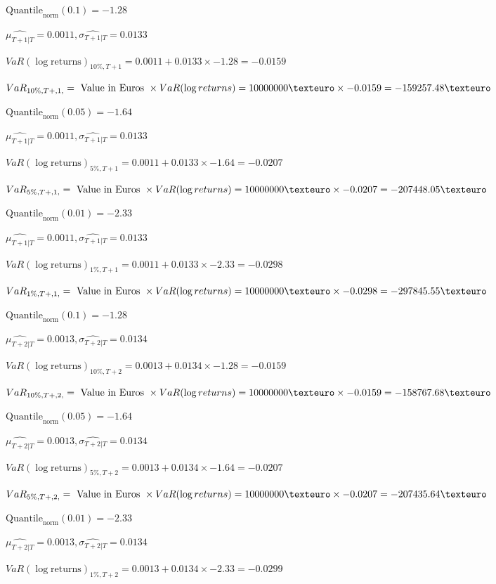$\text{Quantile}_\text{norm}(0.1) = -1.28$

$\hat{\mu_{T+1|T}} = 0.0011, \hat{\sigma_{T+1|T}} = 0.0133$

$VaR(\log \text{returns})_{10\%, T + 1} = 0.0011 + 0.0133\times-1.28 = -0.0159$

$VaR_{10\%, T + ,1,} = \text{ Value in Euros } \times VaR(\log returns) = 10 000 000 \texteuro \times-0.0159 = -159257.48 \texteuro$


$\text{Quantile}_\text{norm}(0.05) = -1.64$

$\hat{\mu_{T+1|T}} = 0.0011, \hat{\sigma_{T+1|T}} = 0.0133$

$VaR(\log \text{returns})_{5\%, T + 1} = 0.0011 + 0.0133\times-1.64 = -0.0207$

$VaR_{5\%, T + ,1,} = \text{ Value in Euros } \times VaR(\log returns) = 10 000 000 \texteuro \times-0.0207 = -207448.05 \texteuro$


$\text{Quantile}_\text{norm}(0.01) = -2.33$

$\hat{\mu_{T+1|T}} = 0.0011, \hat{\sigma_{T+1|T}} = 0.0133$

$VaR(\log \text{returns})_{1\%, T + 1} = 0.0011 + 0.0133\times-2.33 = -0.0298$

$VaR_{1\%, T + ,1,} = \text{ Value in Euros } \times VaR(\log returns) = 10 000 000 \texteuro \times-0.0298 = -297845.55 \texteuro$


$\text{Quantile}_\text{norm}(0.1) = -1.28$

$\hat{\mu_{T+2|T}} = 0.0013, \hat{\sigma_{T+2|T}} = 0.0134$

$VaR(\log \text{returns})_{10\%, T + 2} = 0.0013 + 0.0134\times-1.28 = -0.0159$

$VaR_{10\%, T + ,2,} = \text{ Value in Euros } \times VaR(\log returns) = 10 000 000 \texteuro \times-0.0159 = -158767.68 \texteuro$


$\text{Quantile}_\text{norm}(0.05) = -1.64$

$\hat{\mu_{T+2|T}} = 0.0013, \hat{\sigma_{T+2|T}} = 0.0134$

$VaR(\log \text{returns})_{5\%, T + 2} = 0.0013 + 0.0134\times-1.64 = -0.0207$

$VaR_{5\%, T + ,2,} = \text{ Value in Euros } \times VaR(\log returns) = 10 000 000 \texteuro \times-0.0207 = -207435.64 \texteuro$


$\text{Quantile}_\text{norm}(0.01) = -2.33$

$\hat{\mu_{T+2|T}} = 0.0013, \hat{\sigma_{T+2|T}} = 0.0134$

$VaR(\log \text{returns})_{1\%, T + 2} = 0.0013 + 0.0134\times-2.33 = -0.0299$

